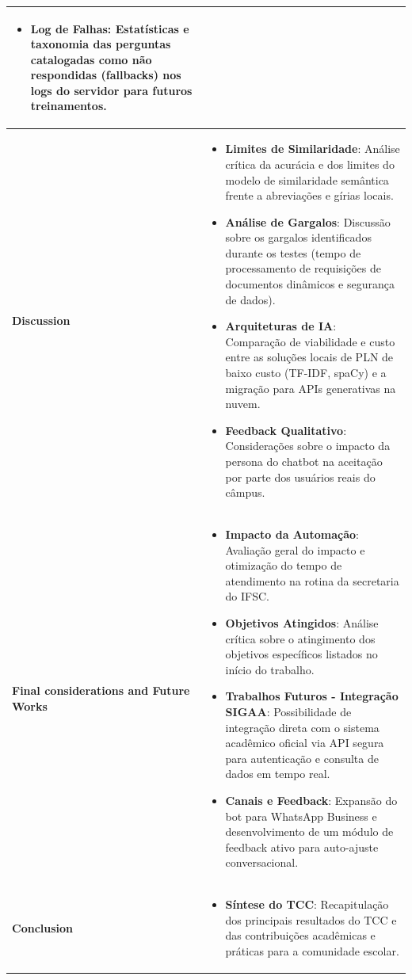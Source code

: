 \documentclass[12pt,a4paper]{article}
\begin{document}
\begin{longtable}{|>{\columncolor{white}\RaggedRight}m{4.0cm}|m{13.0cm}|}
\begin{itemize}[leftmargin=*,noitemsep,topsep=0pt]
        \item \textbf{Log de Falhas}: Estatísticas e taxonomia das perguntas catalogadas como não respondidas (fallbacks) nos logs do servidor para futuros treinamentos.
    \end{itemize} \\ \hline
    \textbf{Discussion} & 
    \begin{itemize}[leftmargin=*,noitemsep,topsep=0pt]
        \item \textbf{Limites de Similaridade}: Análise crítica da acurácia e dos limites do modelo de similaridade semântica frente a abreviações e gírias locais.
        \item \textbf{Análise de Gargalos}: Discussão sobre os gargalos identificados durante os testes (tempo de processamento de requisições de documentos dinâmicos e segurança de dados).
        \item \textbf{Arquiteturas de IA}: Comparação de viabilidade e custo entre as soluções locais de PLN de baixo custo (TF-IDF, spaCy) e a migração para APIs generativas na nuvem.
        \item \textbf{Feedback Qualitativo}: Considerações sobre o impacto da persona do chatbot na aceitação por parte dos usuários reais do câmpus.
    \end{itemize} \\ \hline
    \textbf{Final considerations and Future Works} & 
    \begin{itemize}[leftmargin=*,noitemsep,topsep=0pt]
        \item \textbf{Impacto da Automação}: Avaliação geral do impacto e otimização do tempo de atendimento na rotina da secretaria do IFSC.
        \item \textbf{Objetivos Atingidos}: Análise crítica sobre o atingimento dos objetivos específicos listados no início do trabalho.
        \item \textbf{Trabalhos Futuros - Integração SIGAA}: Possibilidade de integração direta com o sistema acadêmico oficial via API segura para autenticação e consulta de dados em tempo real.
        \item \textbf{Canais e Feedback}: Expansão do bot para WhatsApp Business e desenvolvimento de um módulo de feedback ativo para auto-ajuste conversacional.
    \end{itemize} \\ \hline
    \textbf{Conclusion} & 
    \begin{itemize}[leftmargin=*,noitemsep,topsep=0pt]
        \item \textbf{Síntese do TCC}: Recapitulação dos principais resultados do TCC e das contribuições acadêmicas e práticas para a comunidade escolar.

\end{itemize}
\end{longtable}
\end{document}
